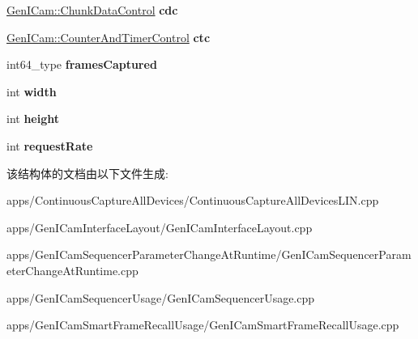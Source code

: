 \begin{DoxyCompactItemize}
\item 
\hypertarget{class_thread_parameter_ab1dae64765e7324faaabeb0355c805f8}{\hyperlink{classmv_i_m_p_a_c_t_1_1acquire_1_1_gen_i_cam_1_1_chunk_data_control}{Gen\+I\+Cam\+::\+Chunk\+Data\+Control} {\bfseries cdc}}\label{class_thread_parameter_ab1dae64765e7324faaabeb0355c805f8}

\item 
\hypertarget{class_thread_parameter_a0dc127b66b8dbc35bdc6d74f0d0cd874}{\hyperlink{classmv_i_m_p_a_c_t_1_1acquire_1_1_gen_i_cam_1_1_counter_and_timer_control}{Gen\+I\+Cam\+::\+Counter\+And\+Timer\+Control} {\bfseries ctc}}\label{class_thread_parameter_a0dc127b66b8dbc35bdc6d74f0d0cd874}

\item 
\hypertarget{class_thread_parameter_acf5f4d40859e7f2138e3287c47a65dd3}{int64\+\_\+type {\bfseries frames\+Captured}}\label{class_thread_parameter_acf5f4d40859e7f2138e3287c47a65dd3}

\item 
\hypertarget{class_thread_parameter_a664776f86271c7f4673980b53ed58643}{int {\bfseries width}}\label{class_thread_parameter_a664776f86271c7f4673980b53ed58643}

\item 
\hypertarget{class_thread_parameter_aa32998ac0580a3feae2a25faa13a6752}{int {\bfseries height}}\label{class_thread_parameter_aa32998ac0580a3feae2a25faa13a6752}

\item 
\hypertarget{class_thread_parameter_a14a4856ad9e7d8d0d90c8c44164aa93b}{int {\bfseries request\+Rate}}\label{class_thread_parameter_a14a4856ad9e7d8d0d90c8c44164aa93b}

\end{DoxyCompactItemize}


该结构体的文档由以下文件生成\+:\begin{DoxyCompactItemize}
\item 
apps/\+Continuous\+Capture\+All\+Devices/Continuous\+Capture\+All\+Devices\+L\+I\+N.\+cpp\item 
apps/\+Gen\+I\+Cam\+Interface\+Layout/Gen\+I\+Cam\+Interface\+Layout.\+cpp\item 
apps/\+Gen\+I\+Cam\+Sequencer\+Parameter\+Change\+At\+Runtime/Gen\+I\+Cam\+Sequencer\+Parameter\+Change\+At\+Runtime.\+cpp\item 
apps/\+Gen\+I\+Cam\+Sequencer\+Usage/Gen\+I\+Cam\+Sequencer\+Usage.\+cpp\item 
apps/\+Gen\+I\+Cam\+Smart\+Frame\+Recall\+Usage/Gen\+I\+Cam\+Smart\+Frame\+Recall\+Usage.\+cpp\end{DoxyCompactItemize}
